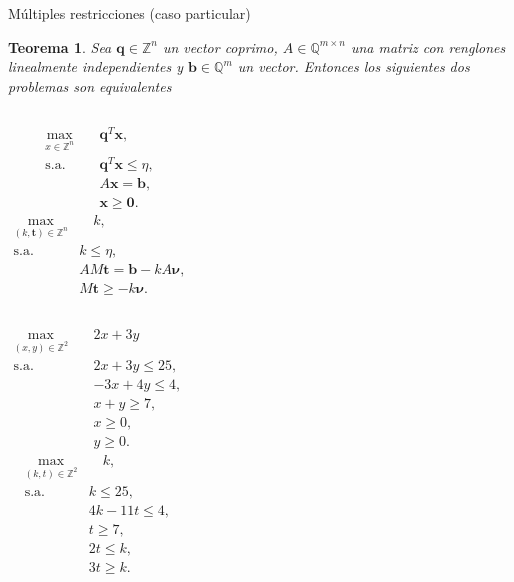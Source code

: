 \documentclass[aspectratio=169]{beamer}
\newtheorem{stheorem}{Teorema}
\theoremstyle{definition}
\newcommand{\Z}{\mathbb{Z}}
\newcommand{\Q}{\mathbb{Q}}
\renewcommand{\vec}[1]{\boldsymbol{#1}}
\begin{document}
\begin{frame}{Múltiples restricciones (caso particular)}
	\begin{stheorem}
		\begin{minipage}[t]{\textwidth}
			\vspace{-0.5\baselineskip}
			Sea $\vec{q} \in \Z^n$ un vector coprimo, $A \in \Q^{m \times n}$ una matriz con
			renglones linealmente independientes y $\vec{b} \in \Q^m$ un vector. Entonces los
			siguientes dos problemas son equivalentes
			\begin{columns}[T]
				\begin{align*}
					\max_{x \in \mathbb{Z}^n} \quad & \vec{q}^T\vec{x}, \\
					\text{s.a.} \quad & \vec{q}^T \vec{x} \leq \eta, \\
								& A \vec{x} = \vec{b}, \\
								& \vec{x} \geq \vec{0}.
				\end{align*}
				\begin{align*}
					\max_{(k, \vec{t}) \in \Z^n} & \quad k, \\
					\text{s.a.} \quad & k \leq \eta, \\
									  & A M \vec{t} = \vec{b} - k A \vec{\nu}, \\
								& M \vec{t} \geq -k \vec{\nu}.
				\end{align*}
			\end{columns}
		\end{minipage}
	\end{stheorem}
\end{frame}

\begin{frame}
	\begin{minipage}[t]{\textwidth}
		\vspace{-0.5\baselineskip}
		\begin{columns}[T]
			\begin{align*}
				\max_{(x, y) \in \mathbb{Z}^2} \quad & 2x + 3y \\
				\text{s.a.} \quad & 2x + 3y \leq 25, \\
								  & -3x + 4y \leq 4, \\
								  & x + y \geq 7, \\
								& x \geq 0, \\
								& y \geq 0.
			\end{align*}
			\begin{align*}
				\max_{(k, t) \in \Z^2} & \quad k, \\
				\text{s.a.} \quad & k \leq 25, \\
								  & 4k - 11t \leq 4, \\
								  & t \geq 7, \\
								  & 2t \leq k, \\
								  & 3t \geq k.
			\end{align*}
		\end{columns}
	\end{minipage}
\end{frame}
\end{document}
